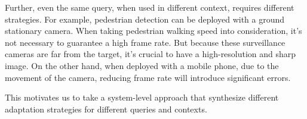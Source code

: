 Further, even the same query, when used in different context, requires different
strategies. For example, pedestrian detection can be deployed with a ground
stationary camera. When taking pedestrian walking speed into consideration, it's
not necessary to guarantee a high frame rate. But because these surveillance
cameras are far from the target, it's crucial to have a high-resolution and
sharp image. On the other hand, when deployed with a mobile phone, due to the
movement of the camera, reducing frame rate will introduce significant
errors.

This motivates us to take a system-level approach that synthesize different
adaptation strategies for different queries and contexts.







